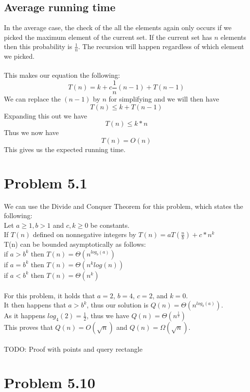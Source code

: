 \documentclass[11pt,psfig]{article}
\begin{document}
\subsection*{Average running time}

In the average case, the check of the all the elements again only occurs if we picked the maximum element of the current set. If the current set has $n$ elements then this probability is $\frac{1}{n}$. The recursion will happen regardless of which element we picked. \\
\\
This makes our equation the following:
\[
T(n) = k + c\frac{1}{n}(n-1) + T(n-1)
\]
We can replace the $(n-1)$ by $n$ for simplifying and we will then have
\[
T(n) \leq k + T(n-1)
\]
Expanding this out we have
\[
T(n) \leq k*n
\]
Thus we now have
\[
T(n) = O(n)
\]
This gives us the expected running time. 

\newpage

\section*{Problem 5.1}

We can use the Divide and Conquer Theorem for this problem, which states the following:\\
Let $a \geq 1, b>1$ and $c,k \geq 0$ be constants. \\
If $T(n)$ defined on nonnegative integers by $T(n) = a T(\frac{n}{b}) + c*n^k$\\
T(n) can be bounded asymptotically as follows:\\
if $a > b^k$ then $T(n) = \Theta( n^{log_b(a)} )$\\
if $a = b^k$ then $T(n) = \Theta( n^k log(n) )$\\
if $a < b^k$ then $T(n) = \Theta( n^k )$\\
\\
For this problem, it holds that $a=2$, $b=4$, $c=2$, and $k=0$. \\
It then happens that $a > b^k$, thus our solution is $Q(n) = \Theta( n^{log_b(a)} )$.\\
As it happens $log_4(2)=\frac{1}{2}$, thus we have $Q(n) = \Theta(n^{\frac{1}{2}})$\\
This proves that $Q(n)=O(\sqrt{n})$ and $Q(n)=\Omega(\sqrt{n})$.\\
\\
TODO: Proof with points and query rectangle

\section*{Problem 5.10}
 
\end{document}
